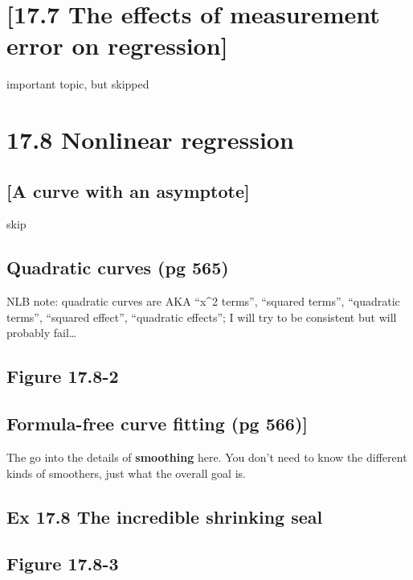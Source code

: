 \documentclass[]{book}
\theoremstyle{definition}
\theoremstyle{definition}
\theoremstyle{definition}
\theoremstyle{remark}
\begin{document}
\section{{[}17.7 The effects of measurement error on
regression{]}}\label{the-effects-of-measurement-error-on-regression}

important topic, but skipped

\section{17.8 Nonlinear regression}\label{nonlinear-regression}

\subsection{{[}A curve with an
asymptote{]}}\label{a-curve-with-an-asymptote}

skip

\subsection{Quadratic curves (pg 565)}\label{quadratic-curves-pg-565}

NLB note: quadratic curves are AKA ``x\^{}2 terms'', ``squared terms'',
``quadratic terms'', ``squared effect'', ``quadratic effects''; I will
try to be consistent but will probably fail\ldots{}

\subsection{Figure 17.8-2}\label{figure-17.8-2}

\subsection{Formula-free curve fitting (pg
566){]}}\label{formula-free-curve-fitting-pg-566}

The go into the details of \textbf{smoothing} here. You don't need to
know the different kinds of smoothers, just what the overall goal is.

\subsection{Ex 17.8 The incredible shrinking
seal}\label{ex-17.8-the-incredible-shrinking-seal}

\subsection{Figure 17.8-3}\label{figure-17.8-3}
\end{document}
